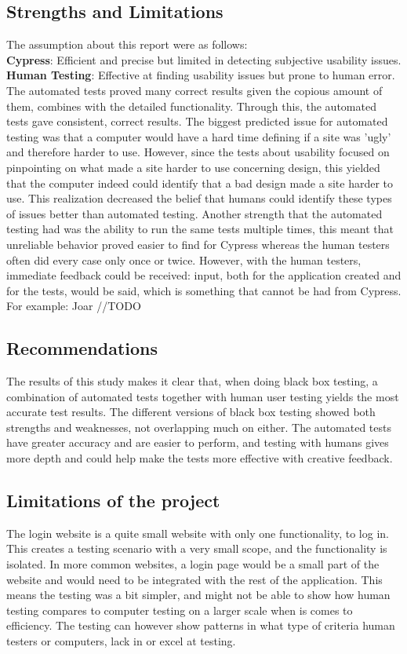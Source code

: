 \documentclass[journal,twocolumn]{IEEEtran}
\begin{document}
\subsection{Strengths and Limitations}
The assumption about this report were as follows:
\\
\textbf{Cypress}: Efficient and precise but limited in detecting subjective usability issues.
\\
\textbf{Human Testing}: Effective at finding usability issues but prone to human error.
\\

The automated tests proved many correct results given the copious amount of them, combines with the detailed functionality. Through this, the automated tests gave consistent, correct results. The biggest predicted issue for automated testing was that a computer would have a hard time defining if a site was 'ugly' and therefore harder to use. However, since the tests about usability focused on pinpointing on what made a site harder to use concerning design, this yielded that the computer indeed could identify that a bad design made a site harder to use.
This realization decreased the belief that humans could identify these types of issues better than automated testing.
Another strength that the automated testing had was the ability to run the same tests multiple times, this meant that unreliable behavior proved easier to find for Cypress whereas the human testers often did every case only once or twice.
However, with the human testers, immediate feedback could be received: input, both for the application created and for the tests, would be said, which is something that cannot be had from Cypress. For example: Joar //TODO

\subsection{Recommendations}
The results of this study makes it clear that, when doing black box testing, a combination of automated tests together with human user testing yields the most accurate test results. The different versions of black box testing showed both strengths and weaknesses, not overlapping much on either. The automated tests have greater accuracy and are easier to perform, and testing with humans gives more depth and could help make the tests more effective with creative feedback.

\subsection{Limitations of the project}
The login website is a quite small website with only one functionality, to log in. This creates a testing scenario with a very small scope, and the functionality is isolated. In more common websites, a login page would be a small part of the website and would need to be integrated with the rest of the application. This means the testing was a bit simpler, and might not be able to show how human testing compares to computer testing on a larger scale when is comes to efficiency. The testing can however show patterns in what type of criteria human testers or computers, lack in or excel at testing.
\end{document}
